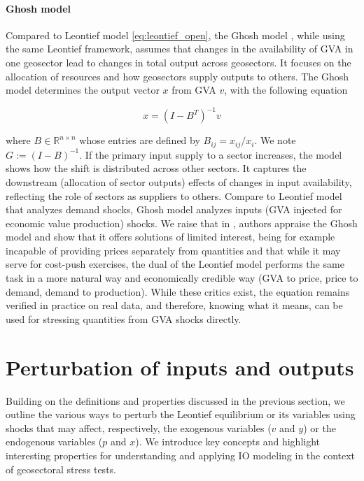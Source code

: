 \documentclass{article}
\begin{document}
\paragraph{Ghosh model} Compared to Leontief model \eqref{eq:leontief_open}, the Ghosh model \cite{ghosh1958input}, while using the same Leontief framework, assumes that changes in the availability of GVA in one geosector lead to changes in total output across geosectors. It focuses on the allocation of resources and how geosectors supply outputs to others. The Ghosh model determines the output vector $x$ from GVA $v$, with the following equation

\begin{equation}
    x = (I - B^T)^{-1} v
\label{eq:ghosh_model}
\end{equation}

\noindent where $B \in \mathbb{R}^{n \times n}$ whose entries are defined by $B_{ij}=x_{ij}/x_{i}$. We note $G := (I - B)^{-1}$. If the primary input supply to a sector increases, the model shows how the shift is distributed across other sectors. It captures the downstream (allocation of sector outputs) effects of changes in input availability, reflecting the role of sectors as suppliers to others. Compare to Leontief model that analyzes demand shocks, Ghosh model analyzes inputs (GVA injected for economic value production) shocks. We raise that in \cite{de2009ghosh}, authors appraise the Ghosh model and show that it offers solutions of limited interest, being for example incapable of providing prices separately from quantities \cite{davar2005input} and that while it may serve for cost-push exercises, the dual of the Leontief model performs the same task in a more natural way and economically credible way (GVA to price, price to demand, demand to production). While these critics exist, the equation remains verified in practice on real data, and therefore, knowing what it means, can be used for stressing quantities from GVA shocks directly. 

\section{Perturbation of inputs and outputs}
\label{sec:perturbation_input_output}

Building on the definitions and properties discussed in the previous section, we outline the various ways to perturb the Leontief equilibrium or its variables using shocks that may affect, respectively, the exogenous variables ($v$ and $y$) or the endogenous variables ($p$ and $x$). We introduce key concepts and highlight interesting properties for understanding and applying IO modeling in the context of geosectoral stress tests. 
\end{document}
